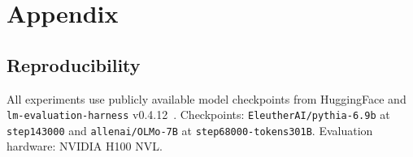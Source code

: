 \section*{Appendix}

\subsection*{Reproducibility}

All experiments use publicly available model checkpoints from HuggingFace and \texttt{lm-evaluation-harness} v0.4.12~\cite{gao2024harness}. Checkpoints: \texttt{EleutherAI/pythia-6.9b} at \texttt{step143000} and \texttt{allenai/OLMo-7B} at \texttt{step68000-tokens301B}. Evaluation hardware: NVIDIA H100 NVL.
